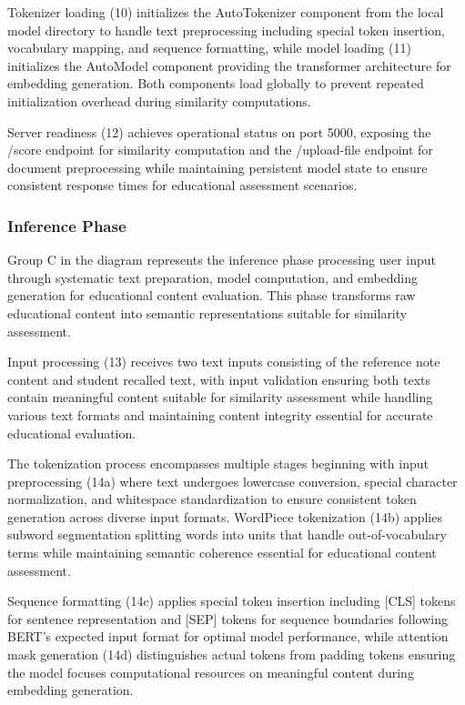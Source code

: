 {Tokenizer loading (10) initializes the AutoTokenizer component from the local model directory to handle text preprocessing including special token insertion, vocabulary mapping, and sequence formatting, while model loading (11) initializes the AutoModel component providing the transformer architecture for embedding generation. Both components load globally to prevent repeated initialization overhead during similarity computations.

Server readiness (12) achieves operational status on port 5000, exposing the /score endpoint for similarity computation and the /upload-file endpoint for document preprocessing while maintaining persistent model state to ensure consistent response times for educational assessment scenarios.

\subsubsection{Inference Phase}

Group C in the diagram represents the inference phase processing user input through systematic text preparation, model computation, and embedding generation for educational content evaluation. This phase transforms raw educational content into semantic representations suitable for similarity assessment.

Input processing (13) receives two text inputs consisting of the reference note content and student recalled text, with input validation ensuring both texts contain meaningful content suitable for similarity assessment while handling various text formats and maintaining content integrity essential for accurate educational evaluation.

The tokenization process encompasses multiple stages beginning with input preprocessing (14a) where text undergoes lowercase conversion, special character normalization, and whitespace standardization to ensure consistent token generation across diverse input formats. WordPiece tokenization (14b) applies subword segmentation splitting words into units that handle out-of-vocabulary terms while maintaining semantic coherence essential for educational content assessment.

Sequence formatting (14c) applies special token insertion including [CLS] tokens for sentence representation and [SEP] tokens for sequence boundaries following BERT's expected input format for optimal model performance, while attention mask generation (14d) distinguishes actual tokens from padding tokens ensuring the model focuses computational resources on meaningful content during embedding generation.

}
